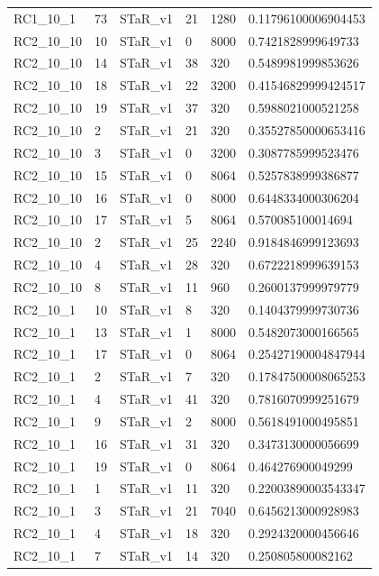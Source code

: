 \begin{tabular}{llllll}
 RC1\_10\_1 & 73 & STaR\_v1 & 21 & 1280 & 0.11796100006904453 \\
 RC2\_10\_10 & 10 & STaR\_v1 & 0 & 8000 & 0.7421828999649733 \\
 RC2\_10\_10 & 14 & STaR\_v1 & 38 & 320 & 0.5489981999853626 \\
 RC2\_10\_10 & 18 & STaR\_v1 & 22 & 3200 & 0.41546829999424517 \\
 RC2\_10\_10 & 19 & STaR\_v1 & 37 & 320 & 0.5988021000521258 \\
 RC2\_10\_10 & 2 & STaR\_v1 & 21 & 320 & 0.35527850000653416 \\
 RC2\_10\_10 & 3 & STaR\_v1 & 0 & 3200 & 0.3087785999523476 \\
 RC2\_10\_10 & 15 & STaR\_v1 & 0 & 8064 & 0.5257838999386877 \\
 RC2\_10\_10 & 16 & STaR\_v1 & 0 & 8000 & 0.6448334000306204 \\
 RC2\_10\_10 & 17 & STaR\_v1 & 5 & 8064 & 0.570085100014694 \\
 RC2\_10\_10 & 2 & STaR\_v1 & 25 & 2240 & 0.9184846999123693 \\
 RC2\_10\_10 & 4 & STaR\_v1 & 28 & 320 & 0.6722218999639153 \\
 RC2\_10\_10 & 8 & STaR\_v1 & 11 & 960 & 0.2600137999979779 \\
 RC2\_10\_1 & 10 & STaR\_v1 & 8 & 320 & 0.1404379999730736 \\
 RC2\_10\_1 & 13 & STaR\_v1 & 1 & 8000 & 0.5482073000166565 \\
 RC2\_10\_1 & 17 & STaR\_v1 & 0 & 8064 & 0.25427190004847944 \\
 RC2\_10\_1 & 2 & STaR\_v1 & 7 & 320 & 0.17847500008065253 \\
 RC2\_10\_1 & 4 & STaR\_v1 & 41 & 320 & 0.7816070999251679 \\
 RC2\_10\_1 & 9 & STaR\_v1 & 2 & 8000 & 0.5618491000495851 \\
 RC2\_10\_1 & 16 & STaR\_v1 & 31 & 320 & 0.3473130000056699 \\
 RC2\_10\_1 & 19 & STaR\_v1 & 0 & 8064 & 0.464276900049299 \\
 RC2\_10\_1 & 1 & STaR\_v1 & 11 & 320 & 0.22003890003543347 \\
 RC2\_10\_1 & 3 & STaR\_v1 & 21 & 7040 & 0.6456213000928983 \\
 RC2\_10\_1 & 4 & STaR\_v1 & 18 & 320 & 0.2924320000456646 \\
 RC2\_10\_1 & 7 & STaR\_v1 & 14 & 320 & 0.250805800082162 \\
 \hline
\end{tabular}
